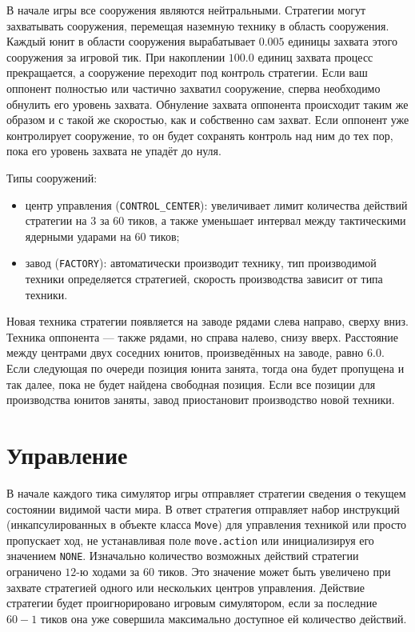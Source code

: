 В начале игры все сооружения являются нейтральными. Стратегии могут захватывать сооружения, перемещая наземную технику в область сооружения.
Каждый юнит в области сооружения вырабатывает $0.005$ единицы захвата этого сооружения за игровой тик. При накоплении $100.0$ единиц захвата
процесс прекращается, а сооружение переходит под контроль стратегии. Если ваш оппонент полностью или частично захватил сооружение, сперва
необходимо обнулить его уровень захвата. Обнуление захвата оппонента происходит таким же образом и с такой же скоростью, как и собственно
сам захват. Если оппонент уже контролирует сооружение, то он будет сохранять контроль над ним до тех пор, пока его уровень захвата не упадёт
до нуля.

Типы сооружений:
\begin{itemize}
    \item центр управления (\texttt{CONTROL\_CENTER}): увеличивает лимит количества действий стратегии на $3$ за $60$ тиков, а также
          уменьшает интервал между тактическими ядерными ударами на $60$ тиков;
    \item завод (\texttt{FACTORY}): автоматически производит технику, тип производимой техники определяется стратегией, скорость
          производства зависит от типа техники.
\end{itemize}

Новая техника стратегии появляется на заводе рядами слева направо, сверху вниз. Техника оппонента --- также рядами, но справа налево, снизу
вверх. Расстояние между центрами двух соседних юнитов, произведённых на заводе, равно $6.0$. Если следующая по очереди позиция юнита занята,
тогда она будет пропущена и так далее, пока не будет найдена свободная позиция. Если все позиции для производства юнитов заняты, завод
приостановит производство новой техники.

\section{Управление}

В начале каждого тика симулятор игры отправляет стратегии сведения о текущем состоянии видимой части мира. В ответ стратегия отправляет
набор инструкций (инкапсулированных в объекте класса \texttt{Move}) для управления техникой или просто пропускает ход, не устанавливая поле
\texttt{move.action} или инициализируя его значением \texttt{NONE}. Изначально количество возможных действий стратегии ограничено $12$-ю
ходами за $60$ тиков. Это значение может быть увеличено при захвате стратегией одного или нескольких центров управления. Действие стратегии
будет проигнорировано игровым симулятором, если за последние $60 - 1$ тиков она уже совершила максимально доступное ей количество действий.

